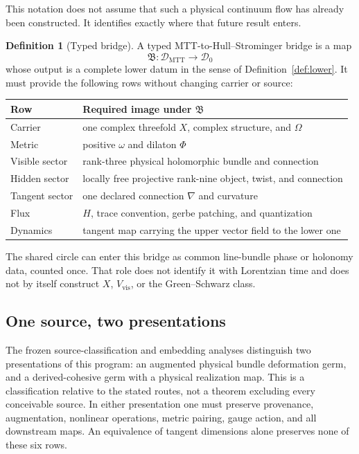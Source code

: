 \documentclass[11pt]{article}
\theoremstyle{definition}
\newtheorem{definition}[theorem]{Definition}
\theoremstyle{remark}
\newcommand{\cD}{\mathcal D}
\newcommand{\HS}{Hull--Strominger}
\begin{document}
This notation does not assume that such a physical continuum flow has already
been constructed.  It identifies exactly where that future result enters.

\begin{definition}[Typed bridge]
\label{def:bridge}
A typed MTT-to-\HS{} bridge is a map
\[
\mathfrak B:\cD_{\mathrm{MTT}}\longrightarrow\cD_0
\]
whose output is a complete lower datum in the sense of
Definition~\ref{def:lower}.  It must provide the following rows without changing
carrier or source:
\begin{center}
\small
\begin{tabular}{@{}p{}p{}@{}}
\toprule
Row & Required image under \(\mathfrak B\)\\
\midrule
Carrier & one complex threefold \(X\), complex structure, and \(\Omega\)\\
Metric & positive \(\omega\) and dilaton \(\Phi\)\\
Visible sector & rank-three physical holomorphic bundle and connection\\
Hidden sector & locally free projective rank-nine object, twist, and connection\\
Tangent sector & one declared connection \(\nabla\) and curvature\\
Flux & \(H\), trace convention, gerbe patching, and quantization\\
Dynamics & tangent map carrying the upper vector field to the lower one\\
\bottomrule
\end{tabular}
\end{center}
\end{definition}

The shared circle can enter this bridge as common line-bundle phase or
holonomy data, counted once.  That role does not identify it with Lorentzian
time and does not by itself construct \(X\), \(V_{\mathrm{vis}}\), or the
Green--Schwarz class.

\subsection{One source, two presentations}
\label{sec:source-presentations}

The frozen source-classification and embedding analyses
\cite{FRG1,FRG1E} distinguish two presentations of this program: an augmented
physical bundle deformation germ, and a derived-cohesive germ with a
physical realization map.  This is a classification relative to the stated
routes, not a theorem excluding every conceivable source.  In either
presentation one must preserve provenance, augmentation, nonlinear
operations, metric pairing, gauge action, and all downstream maps.  An
equivalence of tangent dimensions alone preserves none of these six rows.
\end{document}
